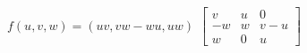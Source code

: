 {
$f(u,v,w) = (uv,vw-wu,uw)$
}
{
$\begin{bmatrix}
	v   & u    & 0\\
	-w & w   & v-u \\
	w   & 0    &u 
\end{bmatrix}$
}